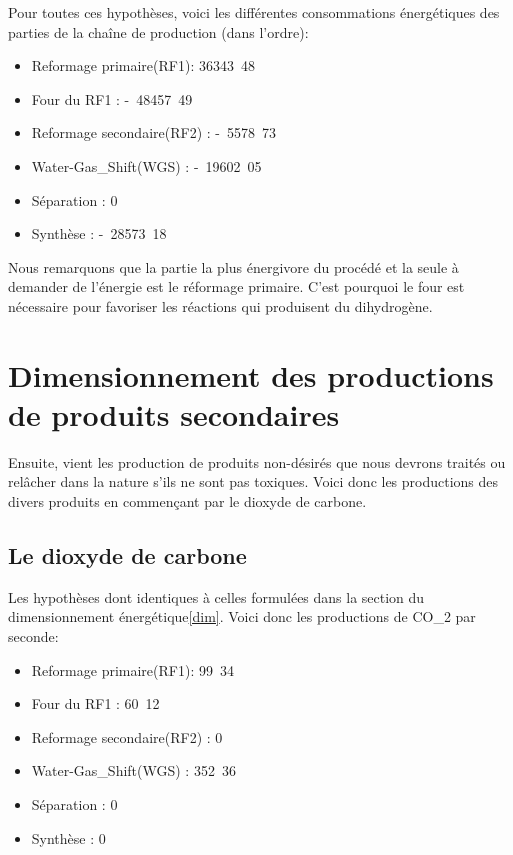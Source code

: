 Pour toutes ces hypothèses, voici les différentes consommations énergétiques des parties de la chaîne de production (dans l'ordre):
\begin{itemize}
	\item Reformage primaire(RF1): \unit{36343.48}{\kilo\joules}\\
	\item Four du RF1 : \unit{-48457.49}{\kilo\joules}\\
	\item Reformage secondaire(RF2) : \unit{-5578.73}{\kilo\joules}\\
	\item Water-Gas_Shift(WGS) : \unit{-19602.05}{\kilo\joules}\\
	\item Séparation : \unit{0}{\kilo\joules}\\
	\item Synthèse : \unit{-28573.18}{\kilo\joules}\\
\end{itemize}
Nous remarquons que la partie la plus énergivore du procédé et la seule à demander de l'énergie est le réformage primaire. C'est pourquoi le four est nécessaire pour favoriser les réactions qui produisent du dihydrogène.

\section{Dimensionnement des productions de produits secondaires}

Ensuite, vient les production de produits non-désirés que nous devrons traités ou relâcher dans la nature s'ils ne sont pas toxiques. Voici donc les productions des divers produits en commençant par le dioxyde de carbone.

\subsection{Le dioxyde de carbone}

Les hypothèses dont identiques à celles formulées dans la section du dimensionnement énergétique\ref{dim}. Voici donc les productions de CO_{2} par seconde:

\begin{itemize}
	\item Reformage primaire(RF1): \unit{99.34}{\mol}\\
	\item Four du RF1 : \unit{60.12}{\mol}\\
	\item Reformage secondaire(RF2) : \unit{0}{\mol}\\
	\item Water-Gas_Shift(WGS) : \unit{352.36}{\mol}\\
	\item Séparation : \unit{0}{\mol}\\
	\item Synthèse : \unit{0}{\mol}\\
\end{itemize}

